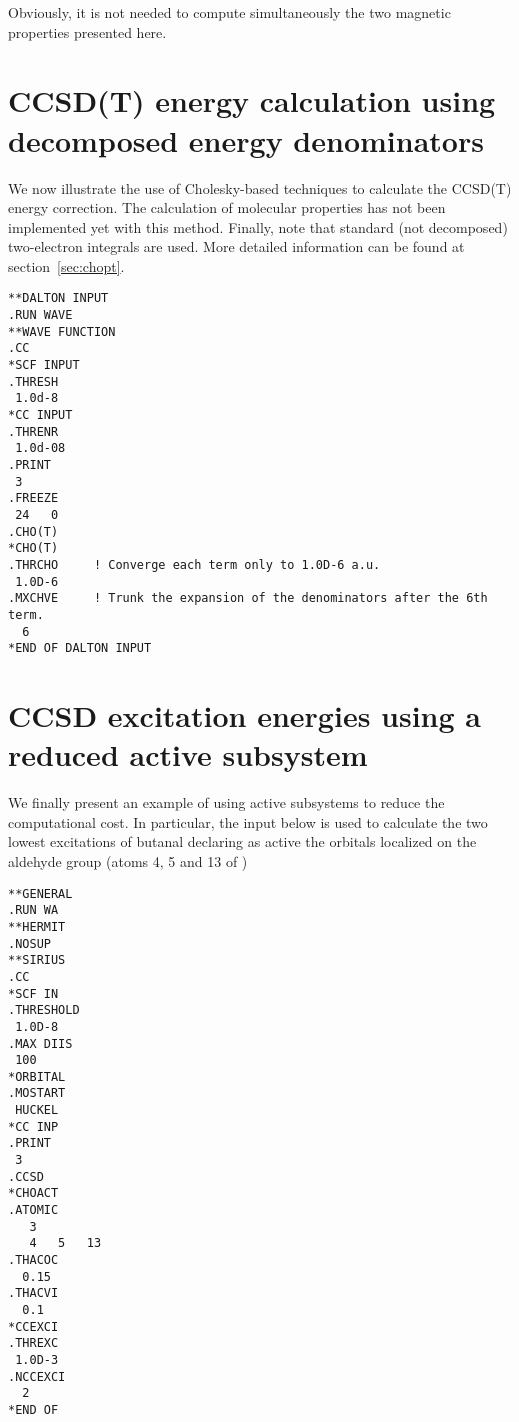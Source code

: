 Obviously, it is not needed to compute simultaneously the two
magnetic properties presented here.

\section{CCSD(T) energy calculation using decomposed 
         energy denominators}

We now illustrate the use of Cholesky-based techniques to calculate
the CCSD(T) energy correction. The calculation of molecular 
properties has not been implemented yet with this method. Finally,
note that standard (not decomposed) two-electron integrals are 
used. More detailed information can be found at section~\ref{sec:chopt}.

\begin{verbatim}
**DALTON INPUT
.RUN WAVE
**WAVE FUNCTION
.CC
*SCF INPUT
.THRESH
 1.0d-8
*CC INPUT
.THRENR
 1.0d-08
.PRINT
 3
.FREEZE
 24   0
.CHO(T)
*CHO(T)
.THRCHO     ! Converge each term only to 1.0D-6 a.u.
 1.0D-6
.MXCHVE     ! Trunk the expansion of the denominators after the 6th term.
  6
*END OF DALTON INPUT
\end{verbatim}

\section{CCSD excitation energies using a reduced active subsystem}

We finally present an example of using active subsystems to reduce the 
computational cost. In particular, the input below is used
to calculate the two lowest excitations of
butanal declaring as active the orbitals localized on the aldehyde group 
(atoms 4, 5 and 13 of \molinp)

\begin{verbatim}
**GENERAL
.RUN WA
**HERMIT
.NOSUP
**SIRIUS
.CC
*SCF IN
.THRESHOLD
 1.0D-8
.MAX DIIS
 100
*ORBITAL
.MOSTART
 HUCKEL
*CC INP
.PRINT
 3
.CCSD
*CHOACT
.ATOMIC
   3
   4   5   13
.THACOC
  0.15
.THACVI
  0.1
*CCEXCI
.THREXC
 1.0D-3
.NCCEXCI
  2
*END OF
\end{verbatim}

